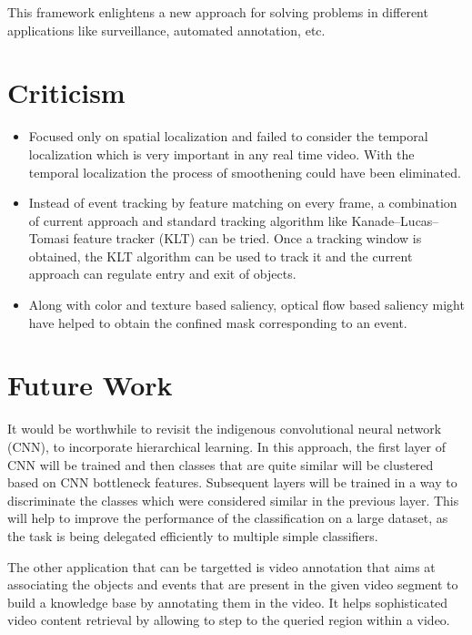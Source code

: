 \par This framework enlightens a new approach for solving problems in different applications like surveillance, automated annotation, etc.

\section{Criticism}
\begin{itemize}
	\item{Focused only on spatial localization and failed to consider the temporal localization which is very important in any real time video.  With the temporal localization the process of smoothening could have been eliminated.}
	\item{Instead of event tracking by feature matching on every frame, a combination of current approach and standard tracking algorithm like Kanade–Lucas–Tomasi feature tracker (KLT) can be tried.  Once a tracking window is obtained, the KLT algorithm can be used to track it and the current approach can regulate entry and exit of objects.}
	\item{Along with color and texture based saliency, optical flow based saliency might have helped to obtain the confined mask corresponding to an event.}
\end{itemize}

\section{Future Work}
It would be worthwhile to revisit the indigenous convolutional neural network (CNN), to incorporate hierarchical learning.  In this approach, the first layer of CNN will be trained and then classes that are quite similar will be clustered based on CNN bottleneck features.  Subsequent layers will be trained in a way to discriminate the classes which were considered similar in the previous layer.  This will help to improve the performance of the classification on a large dataset, as the task is being delegated efficiently to multiple simple classifiers.
\par The other application that can be targetted is video annotation that aims at associating the objects and events that are present in the given video segment to build a knowledge base by annotating them in the video.  It helps sophisticated video content retrieval by allowing to step to the queried region within a video.
